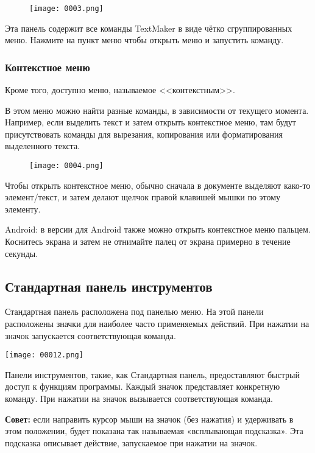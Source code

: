 ﻿\documentclass[a4paper,10pt]{article}
\begin{document}
\begin{figure}[ht]
\texttt{[image: 0003.png]}
\centering
\end{figure}
Эта панель содержит все команды TextMaker в виде чётко сгруппированных меню. Нажмите на пункт меню чтобы открыть меню и запустить команду.

\subsubsection{Контекстное меню}
Кроме того, доступно меню, называемое <<контекстным>>.

В этом меню можно найти разные команды, в зависимости от текущего момента. Например, если выделить текст и затем открыть контекстное меню, там будут присутствовать команды для вырезания, копирования или форматирования выделенного текста.

\begin{figure}[ht]
\texttt{[image: 0004.png]}
\end{figure}

Чтобы открыть контекстное меню, обычно сначала в документе выделяют како-то элемент/текст, и затем делают щелчок правой клавишей мышки по этому элементу.

Android: в версии для Android также можно открыть контекстное меню пальцем. Коснитесь экрана и затем не отнимайте палец от экрана примерно в течение секунды.

\subsection{Стандартная панель инструментов}

Стандартная панель расположена под панелью меню. На этой панели расположены значки для наиболее часто применяемых действий. При нажатии на значок запускается соответствующая команда.

\texttt{[image: 00012.png]}

Панели инструментов, такие, как Стандартная панель, предоставляют быстрый доступ к функциям программы. Каждый значок представляет конкретную команду. При нажатии на значок вызывается соответствующая команда.

\begin{mdframed}[backgroundcolor=blue!10]
\textbf{Совет:} если направить курсор мыши на значок (без нажатия) и удерживать в этом положении,  будет показана так называемая «всплывающая подсказка». Эта подсказка описывает действие, запускаемое при нажатии на значок. 
\end{mdframed}
\end{document}
